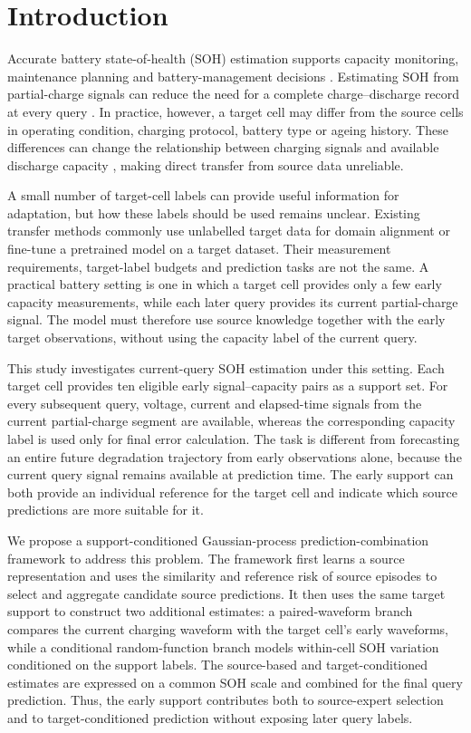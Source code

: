 \documentclass[preprint,12pt]{elsarticle}
\begin{document}
\section{Introduction}
\label{sec:introduction}
Accurate battery state-of-health (SOH) estimation supports capacity monitoring, maintenance planning and battery-management decisions \citep{berecibar2016,waag2014,farmann2015}. Estimating SOH from partial-charge signals can reduce the need for a complete charge--discharge record at every query \citep{wang2024}. In practice, however, a target cell may differ from the source cells in operating condition, charging protocol, battery type or ageing history. These differences can change the relationship between charging signals and available discharge capacity \citep{ecker2012,waldmann2014,dubarry2012}, making direct transfer from source data unreliable.

A small number of target-cell labels can provide useful information for adaptation, but how these labels should be used remains unclear. Existing transfer methods commonly use unlabelled target data for domain alignment or fine-tune a pretrained model on a target dataset. Their measurement requirements, target-label budgets and prediction tasks are not the same. A practical battery setting is one in which a target cell provides only a few early capacity measurements, while each later query provides its current partial-charge signal. The model must therefore use source knowledge together with the early target observations, without using the capacity label of the current query.

This study investigates current-query SOH estimation under this setting. Each target cell provides ten eligible early signal--capacity pairs as a support set. For every subsequent query, voltage, current and elapsed-time signals from the current partial-charge segment are available, whereas the corresponding capacity label is used only for final error calculation. The task is different from forecasting an entire future degradation trajectory from early observations alone, because the current query signal remains available at prediction time. The early support can both provide an individual reference for the target cell and indicate which source predictions are more suitable for it.

We propose a support-conditioned Gaussian-process prediction-combination framework to address this problem. The framework first learns a source representation and uses the similarity and reference risk of source episodes to select and aggregate candidate source predictions. It then uses the same target support to construct two additional estimates: a paired-waveform branch compares the current charging waveform with the target cell's early waveforms, while a conditional random-function branch models within-cell SOH variation conditioned on the support labels. The source-based and target-conditioned estimates are expressed on a common SOH scale and combined for the final query prediction. Thus, the early support contributes both to source-expert selection and to target-conditioned prediction without exposing later query labels.
\end{document}
